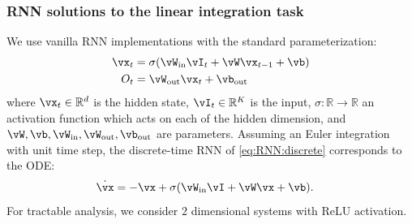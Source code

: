 \documentclass{article} %
\newcounter{ct}
\newcommand{\win}{\vW_{\text{in}}}
\newcommand{\wout}{\vW_{\text{out}}}
\newcommand{\bout}{\vb_{\text{out}}}
\newcommand{\reals}{\mathbb{R}}
\theoremstyle{definition}
\theoremstyle{remark}
\begin{document}



\subsubsection{RNN solutions to the linear integration task}\label{sec:rnn:integration}
We use vanilla RNN implementations with the standard parameterization:
\begin{equation}
  \begin{aligned}
	\vx_t &= \sigma(\win \vI_t + \vW \vx_{t-1} + \vb) \label{eq:RNN:discrete}\\
	O_t &= \wout \vx_t + \bout
  \end{aligned}
\end{equation}
where $\vx_t \in \reals^d$ is the hidden state, $\vI_t \in \reals^K$ is the input,
$\sigma: \reals \to \reals$ an activation function which acts on each of the hidden dimension, and
$\vW, \vb, \win, \wout, \bout$ are parameters.
Assuming an Euler integration with unit time step, the discrete-time RNN of \eqref{eq:RNN:discrete} corresponds to the ODE:
\begin{align}
    \dot{\vx} &= -\vx + \sigma(\win \vI + \vW \vx + \vb). \label{eq:RNN:continuous}
\end{align}
%
For tractable analysis, we consider $2$ dimensional systems with ReLU activation. %
\end{document}
